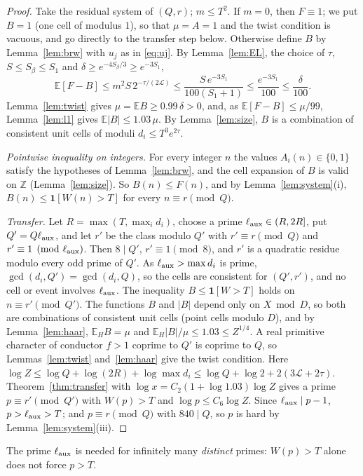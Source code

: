 \documentclass[11pt,reqno]{amsart}
\theoremstyle{definition}
\newcommand{\Lc}{\mathcal L}
\newcommand{\E}{\mathbb E}
\begin{document}
\begin{proof}
Take the residual system of $(Q,r)$; $m\le T^2$.  If $m=0$, then $F\equiv1$; we
put $B=1$ (one cell of modulus $1$), so that $\mu=A=1$ and the twist condition
is vacuous, and go directly to the transfer step below.  Otherwise define $B$ by
Lemma~\ref{lem:brw} with $u_j$ as in \eqref{eq:uj}.  By Lemma~\ref{lem:EL}, the
choice of $\tau$, $S\le S_\beta\le S_1$ and $\delta\ge e^{-4S_\beta/3}\ge e^{-3S_1}$,
\[
 \E[F-B]\le m^2S\,2^{-\tau/(2\Lc)}\le\frac{S\,e^{-3S_1}}{100(S_1+1)}\le\frac{e^{-3S_1}}{100}\le\frac\delta{100}.
\]
Lemma~\ref{lem:twist} gives $\mu=\E B\ge0.99\,\delta>0$, and, as
$\E[F-B]\le\mu/99$, Lemma~\ref{lem:l1} gives $\E|B|\le1.03\,\mu$.  By
Lemma~\ref{lem:size}, $B$ is a combination of consistent unit cells of
moduli $d_i\le T^3e^{2\tau}$.

\emph{Pointwise inequality on integers.}  For every integer $n$ the values
$A_i(n)\in\{0,1\}$ satisfy the hypotheses of Lemma~\ref{lem:brw}, and the cell
expansion of $B$ is valid on $\mathbb Z$ (Lemma~\ref{lem:size}).  So
$B(n)\le F(n)$, and by Lemma~\ref{lem:system}(i), $B(n)\le\mathbf 1[W(n)>T]$ for
every $n\equiv r\pmod Q$.

\emph{Transfer.}  Let $R=\max(T,\max_id_i)$, choose a prime
$\ell_{\rm aux}\in(R,2R]$, put $Q'=Q\ell_{\rm aux}$, and let $r'$ be the class modulo $Q'$
with $r'\equiv r\pmod Q$ and $r'\equiv1\pmod{\ell_{\rm aux}}$.  Then $8\mid Q'$,
$r'\equiv1\pmod8$, and $r'$ is a quadratic residue modulo every odd prime of
$Q'$.  As $\ell_{\rm aux}>\max d_i$ is prime, $\gcd(d_i,Q')=\gcd(d_i,Q)$, so the cells
are consistent for $(Q',r')$, and no cell or event involves $\ell_{\rm aux}$.  The
inequality $B\le\mathbf 1[W>T]$ holds on $n\equiv r'\pmod{Q'}$.  The functions $B$
and $|B|$ depend only on $X\bmod D$, so both are combinations of consistent
unit cells (point cells modulo $D$), and by Lemma~\ref{lem:haar}, $\E_HB=\mu$ and
$\E_H|B|/\mu\le1.03\le Z^{1/4}$.  A real primitive character of conductor
$f>1$ coprime to $Q'$ is coprime to $Q$, so Lemmas~\ref{lem:twist}
and~\ref{lem:haar} give the twist condition.  Here
$\log Z\le\log Q+\log(2R)+\log\max d_i\le\log Q+\log2+2(3\Lc+2\tau)$.
Theorem~\ref{thm:transfer} with $\log x=C_2(1+\log1.03)\log Z$ gives a prime
$p\equiv r'\pmod{Q'}$ with $W(p)>T$ and $\log p\le C_6\log Z$.  Since
$\ell_{\rm aux}\mid p-1$, $p>\ell_{\rm aux}>T$; and $p\equiv r\pmod Q$ with $840\mid Q$, so $p$ is
hard by Lemma~\ref{lem:system}(iii).
\end{proof}

The prime $\ell_{\rm aux}$ is needed for infinitely many \emph{distinct} primes:
$W(p)>T$ alone does not force $p>T$.
\end{document}
